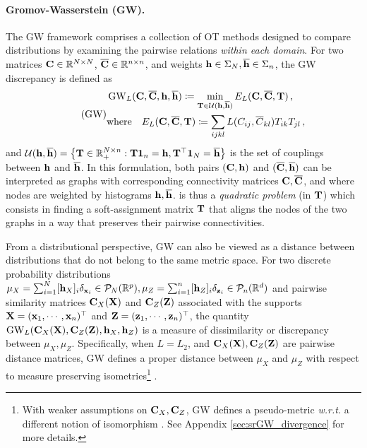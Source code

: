 \paragraph{Gromov-Wasserstein (GW).} The GW framework \citep{memoli2011gromov,sturm2012space} comprises a collection of OT methods designed to compare distributions by examining the pairwise relations \emph{within each domain}. For two matrices ${\mathbf{C}} \in \mathbb{R}^{N \times N}$, $\overline{{\mathbf{C}}} \in \mathbb{R}^{n \times n}$, and weights ${\mathbf{h}} \in \Sigma_N, \overline{{\mathbf{h}}} \in \Sigma_n$, the GW discrepancy is defined as
\begin{equation}
\label{eq:gw_pb} 
\tag{GW}
\begin{split}
	&\operatorname{GW}_L ({\mathbf{C}}, \overline{{\mathbf{C}}}, {\mathbf{h}}, \overline{{\mathbf{h}}}) \coloneqq \min_{{\mathbf{T}} \in {\mathcal{U}}({\mathbf{h}}, \overline{{\mathbf{h}}})} E_L({\mathbf{C}}, \overline{{\mathbf{C}}}, {\mathbf{T}})\,, \\
	&\text{where} \quad E_L({\mathbf{C}}, \overline{{\mathbf{C}}}, {\mathbf{T}}) \coloneqq \sum_{ijkl}  L(C_{ij}, \overline{C}_{kl}) T_{ik} T_{jl}\,,
\end{split}
\end{equation}
and ${\mathcal{U}}({\mathbf{h}}, \overline{{\mathbf{h}}}) = \left\{ {\mathbf{T}} \in \mathbb{R}_+^{N \times n} : {\mathbf{T}} \bm{1}_n = {\mathbf{h}}, {\mathbf{T}}^\top \bm{1}_N = \overline{{\mathbf{h}}} \right\}$ is the set of couplings between ${\mathbf{h}}$ and $\overline{{\mathbf{h}}}$.
In this formulation, both pairs $({\mathbf{C}}, {\mathbf{h}})$ and $(\overline{{\mathbf{C}}}, \overline{{\mathbf{h}}})$ can be interpreted as graphs with corresponding connectivity matrices ${\mathbf{C}}, \overline {{\mathbf{C}}}$, and where nodes are weighted by histograms ${\mathbf{h}}, \overline {{\mathbf{h}}}$.  is thus a \emph{quadratic problem} (in ${\mathbf{T}}$) which consists in finding a soft-assignment matrix ${\mathbf{T}}$ that aligns the nodes of the two graphs in a way that preserves their pairwise connectivities. 

From a distributional perspective, GW can also be viewed as a distance between distributions that do not belong to the same metric space. For two discrete probability distributions $\mu_X = \sum_{i=1}^N [{\mathbf{h}}_X]_i \delta_{{\mathbf{x}}_i} \in {\mathcal{P}}_N(\mathbb{R}^{p}), \mu_Z =\sum_{i=1}^n [{\mathbf{h}}_Z]_i \delta_{{\mathbf{z}}_i} \in {\mathcal{P}}_n(\mathbb{R}^d)$ and pairwise similarity matrices ${\mathbf{C}}_{X}({\mathbf{X}})$ and ${\mathbf{C}}_{Z}({\mathbf{Z}})$ associated with the supports ${\mathbf{X}} = ({\mathbf{x}}_1, \cdots, {\mathbf{x}}_n)^\top$ and ${\mathbf{Z}} = ({\mathbf{z}}_1, \cdots, {\mathbf{z}}_n)^\top$, the quantity $\operatorname{GW}_L ({\mathbf{C}}_{X}({\mathbf{X}}), {\mathbf{C}}_{Z}({\mathbf{Z}}), {\mathbf{h}}_X, {\mathbf{h}}_Z)$ is a measure of dissimilarity or discrepancy between $\mu_X, \mu_Z$. Specifically, when $L=L_2$, and ${\mathbf{C}}_{X}({\mathbf{X}}), {\mathbf{C}}_{Z}({\mathbf{Z}})$ are pairwise distance matrices, GW defines a proper distance between $\mu_X$ and $\mu_Z$ with respect to measure preserving isometries\footnote{With weaker assumptions on ${\mathbf{C}}_{X}, {\mathbf{C}}_{Z}$, GW defines a pseudo-metric \textit{w.r.t.} a different notion of isomorphism \citep{chowdhury2019gromov}. See Appendix \ref{sec:srGW_divergence} for more details.} \citep{memoli2011gromov}. 

